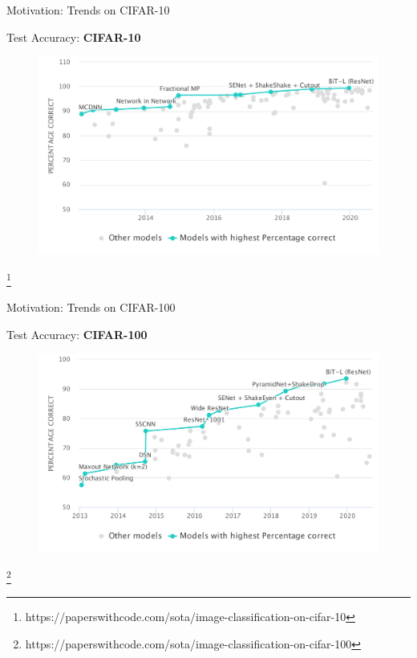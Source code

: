 \documentclass[mathserif,notheorems, hyperref={colorlinks, urlcolor=blue, linkcolor=blue}]{beamer}
\newcommand{\source}[1]{{\let\thefootnote\relax\footnote{{\tiny #1}}}}
\begin{document}
    \begin{frame}{Motivation: Trends on CIFAR-10} 
        \begin{center}
            \Large Test Accuracy: \textbf{CIFAR-10}
        \end{center}

        \begin{figure}[]
            \centering
            \includegraphics[width=\linewidth]{figures/Cifar10}
        \end{figure} 

        \source{https://paperswithcode.com/sota/image-classification-on-cifar-10}
    \end{frame}

    \begin{frame}{Motivation: Trends on CIFAR-100} 
        \begin{center}
            \Large Test Accuracy: \textbf{CIFAR-100}
        \end{center}

        \begin{figure}[]
            \centering
            \includegraphics[width=\linewidth]{figures/Cifar100}
        \end{figure} 

        \source{https://paperswithcode.com/sota/image-classification-on-cifar-100}
    \end{frame}
\end{document}
